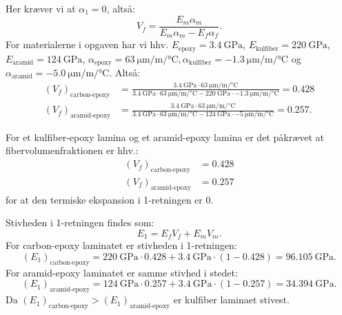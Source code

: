 \begin{derivation}
  Her kræver vi at $\alpha_1 = 0$, altså:
  \begin{equation*}
    V_f = \frac{E_m \alpha_m}{E_m \alpha_m - E_f \alpha_f}
  .\end{equation*}
  For materialerne i opgaven har vi hhv. $E_{\text{epoxy}} = \qty{3,4}{\GPa}$, $E_{\text{kulfiber}} = \qty{220}{\GPa}$, $E_{\text{aramid}} = \qty{124}{\GPa}$, $\alpha_{\text{epoxy}} = \qty{63}{\micro\m\per\m\per\celsius}, \alpha_{\text{kulfiber}} = \qty{-1,3}{\micro\m\per\m\per\celsius}$ og $\alpha_{\text{aramid}} = \qty{-5,0}{\micro\m\per\m\per\celsius}$.
  Altså:
  \begin{align*}
    \left( V_f \right)_{\text{carbon-epoxy}} &= \frac{\qty{3,4}{\GPa} \cdot \qty{63}{\micro\m\per\m\per\celsius}}{\qty{3,4}{\GPa} \cdot \qty{63}{\micro\m\per\m\per\celsius} - \qty{220}{\GPa} \cdot \qty{-1,3}{\micro\m\per\m\per\celsius}} = \num{0.428} \\
    \left( V_f \right)_{\text{aramid-epoxy}} &= \frac{\qty{3,4}{\GPa} \cdot \qty{63}{\micro\m\per\m\per\celsius}}{\qty{3,4}{\GPa} \cdot \qty{63}{\micro\m\per\m\per\celsius} - \qty{124}{\GPa} \cdot \qty{-5}{\micro\m\per\m\per\celsius}} =\num{0.257}
  .\end{align*}
  
  \begin{subresult}
    For et kulfiber-epoxy lamina og et aramid-epoxy lamina er det påkrævet at fibervolumenfraktionen er hhv.:
    \begin{align*}
      \left( V_f \right)_{\text{carbon-epoxy}} &= \num{0,428}  \\
      \left( V_f \right)_{\text{aramid-epoxy}} &= \num{0,257} 
    \end{align*}
    for at den termiske ekspansion i 1-retningen er 0.
  \end{subresult}

  \derivationpart

  Stivheden i 1-retningen findes som:
  \begin{equation*}
    E_1 = E_f V_f + E_m V_m
  .\end{equation*}
  For carbon-epoxy laminatet er stivheden i 1-retningen:
  \begin{equation*}
    \left( E_1 \right)_{\text{carbon-epoxy}} = \qty{220}{\GPa} \cdot \num{0,428} + \qty{3,4}{\GPa} \cdot \left( 1 - \num{0,428}  \right) = \qty{96.105}{\giga\pascal}
  .\end{equation*}
  For aramid-epoxy laminatet er samme stivhed i stedet:
  \begin{equation*}
    \left( E_1 \right)_{\text{aramid-epoxy}} = \qty{124}{\GPa} \cdot \num{0,257} + \qty{3,4}{\GPa} \cdot \left( 1 - \num{0,257}  \right) = \qty{34.394}{\giga\pascal}
  .\end{equation*}
  Da $\left( E_1 \right)_{\text{carbon-epoxy}} > \left( E_1 \right)_{\text{aramid-epoxy}}$ er kulfiber laminaet stivest.


\end{derivation}

